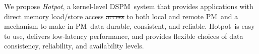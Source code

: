 \documentclass[sigconf]{acmart}
\newcommand{\DIFdelFL}[1]{}
\renewcommand{\em}{\it}
\newcommand{\open}{\textit{open}}
\newcommand{\close}{\textit{close}}
\newcommand{\mmap}{\textit{mmap}}
\newcommand{\unmap}{\textit{munmap}}
\newcommand{\fetch}{\textit{gfetch}}
\newcommand{\acquire}{\textit{acquire}}
\newcommand{\commit}{\textit{commit}}
\newcommand{\barrier}{\textit{thread-barrier}}
\newcommand{\dsnvm}{DSPM}
\newcommand{\nvm}{PM}
\newcommand{\hotpot}{Hotpot}
\providecommand{\DIFdel}[1]{{\protect\color{red}\sout{#1}}}                      %
\providecommand{\DIFdelbegin}{} %
\providecommand{\DIFdelend}{} %
\providecommand{\DIFdelFL}[1]{\DIFdel{#1}} %
\begin{document}
{We propose {\em \hotpot}, a kernel-level \dsnvm\ system that %
provides applications with direct memory load/store access \DIFdelbegin \DIFdel{access }\DIFdelend to both local and remote \nvm\
and a mechanism to make in-\nvm\ data durable, consistent, and reliable.
\hotpot\ is easy to use, delivers low-latency performance, 
and provides flexible choices of data consistency, reliability, and availability levels.
\DIFdelbegin %

\DIFdelFL{API }%
\DIFdelFL{Explanation }%
\DIFdelFL{Backward }%
\DIFdelFL{\open\ (\close) }%
\DIFdelFL{open or create (close) a \dsnvm\ dataset }%
\DIFdelFL{same as current }%
\DIFdelFL{\mmap\ (\unmap) }%
\DIFdelFL{map (unmap) a \dsnvm\ region in a dataset to application address space }%
\DIFdelFL{same as current }%
\DIFdelFL{\commit\  }%
\DIFdelFL{commit a set of data and make $N$ persistent replicas }%
\DIFdelFL{similar to msync }%
\DIFdelFL{\acquire\  }%
\DIFdelFL{acquire single writer permission }%
\DIFdelFL{\barrier\ }%
\DIFdelFL{helper function to synchronzation threads on different nodes }%
}
\end{document}
